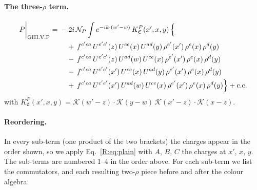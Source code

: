 \documentclass[10pt]{article}
\numberwithin{equation}{section}
\newcommand{\KK}{\mathcal K}
\newcommand{\NP}{\mathcal N_{P}}
\begin{document}
\paragraph{The three-$\rho$ term.}
\begin{align}
P\bigg|_{\rm GIII.V.P}={}&-2i\,\NP\int e^{-ik\cdot(w'-w)}\,K^{P}_{\mathfrak C}(x',x,y)\,\Big\{\notag\\
&\quad +\,f^{c'ca}\,U^{e'c'}(z)\,U^{ce}(x)\,U^{ad}(y)\,\rho^{e'}(x')\,\rho^{e}(x)\,\rho^{d}(y)\notag\\
&\quad -\,f^{c'ca}\,U^{e'c'}(z)\,U^{ad}(w)\,U^{ce}(x)\,\rho^{e'}(x')\,\rho^{e}(x)\,\rho^{d}(y)\notag\\
&\quad -\,f^{c'ca}\,U^{c'e'}(x')\,U^{ce}(x)\,U^{ad}(y)\,\rho^{e'}(x')\,\rho^{e}(x)\,\rho^{d}(y)\notag\\
&\quad +\,f^{c'ca}\,U^{c'e'}(x')\,U^{ad}(w)\,U^{ce}(x)\,\rho^{e'}(x')\,\rho^{e}(x)\,\rho^{d}(y)\Big\}+{\rm c.c.}\label{B:eq:in-GIII.V.P}
\end{align}
with $K^{P}_{\mathfrak C}(x',x,y)=\KK(w'-z)\cdot\KK(y-w)\,\KK(x'-z)\cdot\KK(x-z)$.
\paragraph{Reordering.} In every sub-term (one product of the two brackets) the charges appear in the order shown, so we apply Eq.~\eqref{R:eq:plain} with $A$, $B$, $C$ the charges at $x'$, $x$, $y$. The sub-terms are numbered 1--4 in the order above. For each sub-term we list the commutators, and each resulting two-$\rho$ piece before and after the colour algebra.
\end{document}
